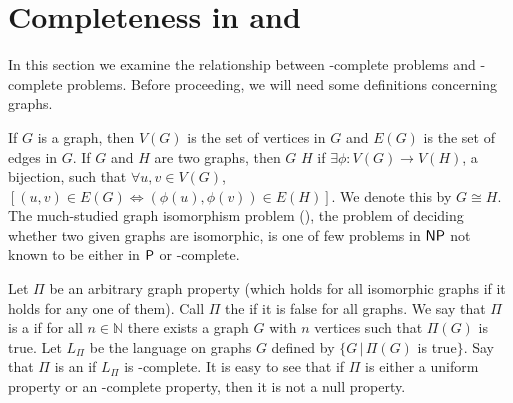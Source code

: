 \section{Completeness in \texorpdfstring{\NPEq}{NPEq} and \texorpdfstring{\NP}{NP}}
\label{sec:npeqcompleteness}

In this section we examine the relationship between \NP-complete problems and \NPEq-complete problems.
Before proceeding, we will need some definitions concerning graphs.

If $G$ is a graph, then $V(G)$ is the set of vertices in $G$ and $E(G)$ is the set of edges in $G$.
If $G$ and $H$ are two graphs, then $G$  $H$ if $\exists\phi\colon V(G)\to V(H)$, a bijection, such that $\forall u,v\in V(G)$, $[(u,v)\in E(G)\iff (\phi(u), \phi(v))\in E(H)]$.
We denote this by $G\cong H$.
The much-studied graph isomorphism problem (\GI), the problem of deciding whether two given graphs are isomorphic, is one of few problems in $\NP$ not known to be either in $\P$ or \NP-complete.

Let $\Pi$ be an arbitrary graph property (which holds for all isomorphic graphs if it holds for any one of them).
Call $\Pi$ the  if it is false for all graphs.
We say that $\Pi$ is a  if for all $n\in\mathbb{N}$ there exists a graph $G$ with $n$ vertices such that $\Pi(G)$ is true.
Let $L_\Pi$ be the language on graphs $G$ defined by $\{G\,|\,\Pi(G)$ is true$\}$.
Say that $\Pi$ is an  if $L_\Pi$ is \NP-complete.
It is easy to see that if $\Pi$ is either a uniform property or an \NP-complete property, then it is not a null property.

